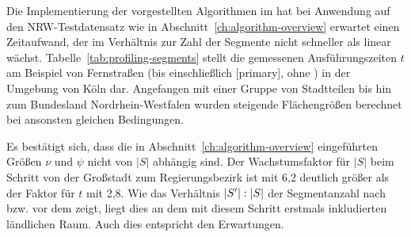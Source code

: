 \documentclass[../main/thesis.tex]{subfiles}
\begin{document}
Die Implementierung der vorgestellten Algorithmen im  hat bei Anwendung auf den NRW-Testdatensatz wie in Abschnitt~\ref{ch:algorithm-overview} erwartet einen Zeitaufwand, der im Verhältnis zur Zahl der Segmente nicht schneller als linear wächst.
Tabelle~\ref{tab:profiling-segments} stellt die gemessenen Ausführungszeiten $t$ am Beispiel von Fernstraßen (bis einschließlich [primary], ohne ) in der Umgebung von Köln dar.
Angefangen mit einer Gruppe von Stadtteilen bis hin zum Bundesland Nordrhein-Westfalen wurden steigende Flächengrößen berechnet bei ansonsten gleichen Bedingungen.


Es bestätigt sich, dass die in Abschnitt~\ref{ch:algorithm-overview} eingeführten Größen $\nu$ und $\psi$ nicht von $|S|$ abhängig sind.
Der Wachstumsfaktor für $|S|$ beim Schritt von der Großstadt zum Regierungsbezirk ist mit 6,2 deutlich größer als der Faktor für $t$ mit 2,8.
Wie das Verhältnis $|S'|\nobreak:\nobreak|S|$ der Segmentanzahl nach bzw. vor dem  zeigt, liegt dies an dem mit diesem Schritt erstmals inkludierten ländlichen Raum.
Auch dies entspricht den Erwartungen.

\end{document}
